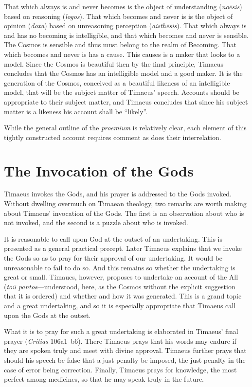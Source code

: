 That which always is and never becomes is the object of understanding (\emph{noēsis}) based on reasoning (\emph{logos}). That which becomes and never is is the object of opinion (\emph{doxa}) based on unreasoning perception (\emph{aisthēsis}). That which always is and has no becoming is intelligible, and that which becomes and never is sensible. The Cosmos is sensible and thus must belong to the realm of Becoming. That which becomes and never is has a cause. This causes is a maker that looks to a model. Since the Cosmos is beautiful then by the final principle, Timaeus concludes that the Cosmos has an intelligible model and a good maker. It is the generation of the Cosmos, conceived as a beautiful likeness of an intelligible model, that will be the subject matter of Timaeus' speech. Accounts should be appropriate to their subject matter, and Timaeus concludes that since his subject matter is a likeness his account shall be ``likely''.

While the general outline of the \emph{proemium} is relatively clear, each element of this tightly constructed account requires comment as does their interrelation. 


\section{The Invocation of the Gods} %
\label{sec:the_invocation_of_the_gods}

Timaeus invokes the Gods, and his prayer is addressed to the Gods invoked. Without dwelling overmuch on Timaean theology, two remarks are worth making about Timae\-us' invocation of the Gods. The first is an observation about who is not invoked, and the second is a puzzle about who is invoked.

It is reasonable to call upon God at the outset of an undertaking. This is presented as a general practical precept. Later Timaeus explains that we invoke the Gods so as to pray for their approval of our undertaking. It would be unreasonable to fail to do so. And this remains so whether the undertaking is great or small. Timaues, however, proposes to undertake an account of the All (\emph{toū pantos}---understood, here, as the Cosmos without the explicit suggestion that it is ordered) and whether and how it was generated. This is a grand topic and a great undertaking, and so it is especially appropriate that Timaeus call upon the Gods at the outset.

What it is to pray for such a great undertaking is elaborated in Timaeus' final prayer (\emph{Critias} 106a1–b6). There Timaeus prays that his words may endure if they are spoken truly and meet with divine approval. Timaeus further prays that should his speech be false that a just penalty be imposed, the just penalty in the case of error being correction. Finally, Timaeus prays for knowledge, the most perfect among medicines, so that he may speak truly in the future.


